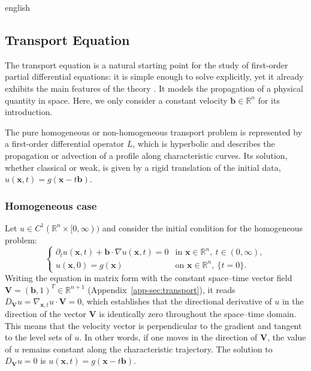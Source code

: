 \documentclass[12pt,letterpaper,twoside]{book}
\begin{document}
\begin{hyphenrules}{english}
\subsection{Transport Equation}\label{subsec:transport}

The transport equation is a natural starting point for the study of first-order partial differential
equations: it is simple enough to solve explicitly, yet it already exhibits the main features of the
theory \cite{evans2010}. It models the propagation of a physical quantity in space. Here, we only
consider a constant velocity $\mathbf{b}\in\mathbb{R}^n$ for its introduction.

The pure homogeneous or non-homogeneous transport problem is represented by a first-order differential
operator $L$, which is hyperbolic and describes the propagation or advection of a profile along
characteristic curves. Its solution, whether classical or weak, is given by a rigid translation of the
initial data, $u(\mathbf{x},t)=g(\mathbf{x}-t\mathbf{b})$.

\subsubsection{Homogeneous case}
Let $u\in C^1(\mathbb{R}^n\times[0,\infty))$ and consider the initial condition for the homogeneous problem:
\begin{equation}
  \begin{cases}
    \partial_t u(\mathbf{x},t)+\mathbf{b}\cdot\nabla u(\mathbf{x},t)=0 & \text{in } \mathbf{x}\in\mathbb{R}^n,\ t\in(0,\infty),\\
    u(\mathbf{x},0)=g(\mathbf{x}) & \text{on } \mathbf{x}\in\mathbb{R}^n,\ \{t=0\}.
  \end{cases}
  \label{eq:transport-hom}
\end{equation}
Writing the equation in matrix form with the constant space--time vector field
$\mathbf{V}=(\mathbf{b},1)^{T}\in\mathbb{R}^{n+1}$ (Appendix~\ref{app-sec:transport}), it reads
$D_{\mathbf{V}}u=\nabla_{\mathbf{x},t}u\cdot\mathbf{V}=0$, which establishes that the directional derivative of $u$ in the direction of the vector $\mathbf{V}$ is
identically zero throughout the space--time domain. This means that the velocity vector is perpendicular
to the gradient and tangent to the level sets of $u$. In other words, if one moves in the direction of
$\mathbf{V}$, the value of $u$ remains constant along the characteristic trajectory. The solution to
$D_{\mathbf{V}}u=0$ is $u(\mathbf{x},t)=g(\mathbf{x}-t\mathbf{b})$.


\end{hyphenrules}
\end{document}
